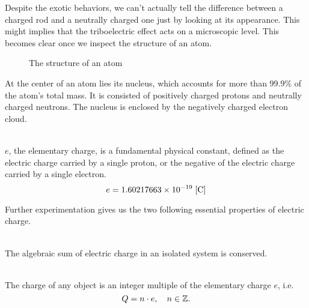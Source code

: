 Despite the exotic behaviors, we can't actually tell the difference between a charged rod and a neutrally charged one just by looking at its appearance. This might implies that the triboelectric effect acts on a microscopic level. This becomes clear once we inspect the structure of an atom.\par
\begin{figure}[htbp]
    \centering
    
    \caption{The structure of an atom}
\end{figure}
At the center of an atom lies its nucleus, which accounts for more than $99.9\%$ of the atom's total mass. It is consisted of positively charged protons and neutrally charged neutrons. The nucleus is enclosed by the negatively charged electron cloud.
\begin{definition}
    \ \\$e$, the elementary charge, is a fundamental physical constant, defined as the electric charge carried by a single proton, or the negative of the electric charge carried by a single electron.
    $$e=1.60217663 \times 10^{-19}\;[\rm{C}]$$
\end{definition}
Further experimentation gives us the two following essential properties of electric charge.
\begin{property}
    \ \\The algebraic sum of electric charge in an isolated system is conserved.
\end{property}
\begin{property}
    \ \\The charge of any object is an integer multiple of the elementary charge $e$, i.e.
    $$Q=n\cdot e,\quad n\in\mathbb{Z}.$$
\end{property}
